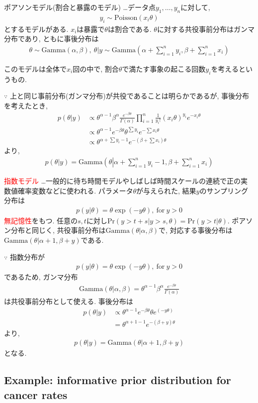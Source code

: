 \documentclass[11pt,a4pape,dvipdfmx]{jarticle}
\newcommand{\eqn}[1]{\begin{align*}#1\end{align*}}
\newcommand{\tcr}[1]{\textcolor{red}{#1}}
\begin{document}
\begin{itembox}[l]{ポアソンモデル(割合と暴露のモデル)}
…データ点$y_1,\dots,y_n$に対して,
\eqn{y_i\sim \text{Poisson}(x_i\theta)}
とするモデルがある.
$x_i$は暴露で$\theta$は割合である.
$\theta$に対する共役事前分布はガンマ分布であり, ともに事後分布は
\eqn{\theta\sim\text{Gamma}(\alpha,\beta),\ \theta|y \sim \text{Gamma}\left(\alpha+\sum_{i=1}^n y_i, \beta+\sum_{i=1}^n x_i\right)}
\end{itembox}
このモデルは全体で$x_i$回の中で, 割合$\theta$で満たす事象の起こる回数$y_i$を考えるというもの.

$\because$
上と同じ事前分布(ガンマ分布)が共役であることは明らかであるが, 事後分布を考えたとき,
\eqn{p(\theta|y)
&\propto \theta^{\alpha-1}\beta^{\alpha}\frac{e^{-\beta\theta}}{\Gamma(\alpha)} \prod_{i=1}^n\frac{1}{y_i!}(x_i\theta)^{y_i}e^{-x_i\theta} \\
&\propto \theta^{\alpha-1}e^{-\beta\theta} \theta^{\sum y_i} e^{-\sum x_i\theta} \\
&\propto \theta^{\alpha+\sum y_i-1} e^{-(\beta+\sum x_i)\theta}}
より,
\eqn{p(\theta|y)=\text{Gamma}\left(\theta \left|\alpha+\sum_{i=1}^n y_i-1,\beta+\sum_{i=1}^n x_i\right.\right)}


\begin{itembox}[l]{\tcr{指数モデル}}
…一般的に待ち時間モデルやしばしば時間スケールの連続で正の実数値確率変数などに使われる.
パラメータ$\theta$が与えられた, 結果$y$のサンプリング分布は
\eqn{p(y|\theta)=\theta\exp(-y\theta),\ \text{for}\ y>0}
\tcr{無記憶性}をもつ.
任意の$s, t$に対し$\text{Pr}(y>t+s|y>s,\theta)=\text{Pr}(y>t|\theta)$.
ポアソン分布と同じく, 共役事前分布は$\text{Gamma}(\theta|\alpha,\beta)$で, 対応する事後分布は$\text{Gamma}(\theta|\alpha+1,\beta+y)$である.
\end{itembox}
$\because$
指数分布が
\eqn{p(y|\theta)=\theta\exp(-y\theta),\ \text{for}\ y>0}
であるため, ガンマ分布
\eqn{\text{Gamma}(\theta|\alpha,\beta)=\theta^{\alpha-1}\beta^{\alpha}\frac{e^{-\beta\theta}}{\Gamma(\alpha)}}
は共役事前分布として使える.
事後分布は
\eqn{p(\theta|y)
&\propto  \theta^{\alpha-1}e^{-\beta\theta} \theta e^{(-y\theta)}\\
&= \theta^{\alpha+1-1} e^{-(\beta+y)\theta}}
より,
\eqn{p(\theta|y)=\text{Gamma}(\theta|\alpha+1,\beta+y)}
となる.


\subsection{Example: informative prior distribution for cancer rates}
\end{document}

